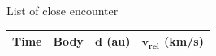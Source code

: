 \documentclass[final]{beamer}
\newlength{\onecolwid}
\begin{document}
\begin{frame}[t]
\begin{columns}[t]
\begin{column}{\onecolwid}
\begin{alertblock}{List of close encounter}
\begin{table}
\vspace{2ex}
\begin{tabular}{l c c c}
\toprule
\textbf{Time} & \textbf{   Body   } & \textbf{  $\boldsymbol{d}$ (au)  } & \textbf{$\boldsymbol{v_{rel}}$ (km/s)} \\
\midrule\bottomrule
\end{tabular}
\end{table}
\end{alertblock}

\end{column} 


\end{columns} 
\end{frame}
\end{document}
